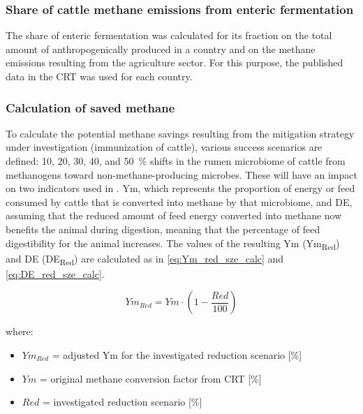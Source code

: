 \subsubsection{Share of cattle methane emissions from enteric fermentation}

 The share of enteric fermentation was calculated for its fraction on the total amount of anthropogenically produced  in a country and on the methane emissions resulting from the agriculture sector. For this purpose, the published data in the CRT was used for each country. 


\subsubsection{Calculation of saved methane}
\label{sec:methods-calc_saved_methane}

To calculate the potential methane savings resulting from the mitigation strategy under investigation (immunization of cattle), various success scenarios are defined: 10, 20, 30, 40, and 50~\% shifts in the rumen microbiome of cattle from methanogens toward non-methane-producing microbes.
These will have an impact on two indicators used in \citet{IPCC_2019_Chapter_EnterFE}. \acrshort{Ym}, which represents the proportion of energy or feed consumed by cattle that is converted into methane by that microbiome, and \acrshort{DE}, assuming that the reduced amount of feed energy converted into methane now benefits the animal during digestion, meaning that the percentage of feed digestibility for the animal increases.
The values of the resulting Ym (Ym\textsubscript{Red}) and DE (DE\textsubscript{Red}) are calculated as in \cref{eq:Ym_red_sze_calc} and \cref{eq:DE_red_sze_calc}. 

\begin{equation}
	Ym_{Red} = Ym \cdot \left(1 - \frac{Red}{100} \right)
	\label{eq:Ym_red_sze_calc}
\end{equation}

\noindent where:
\begin{itemize}
	\item $Ym_{Red}$ = adjusted Ym for the investigated reduction scenario [\%]
	\item $Ym$ = original methane conversion factor from CRT [\%]
	\item $Red$ = investigated reduction scenario [\%]
\end{itemize}


